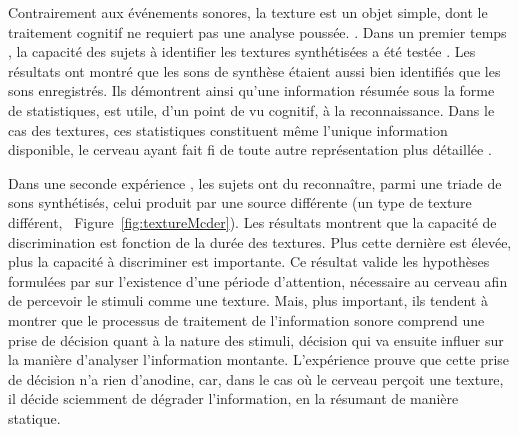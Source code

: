 Contrairement aux événements sonores, la texture est un objet simple, dont le traitement cognitif ne requiert pas une analyse poussée.    . 
Dans un premier temps  \citep{mcdermott2011sound}, la capacité des sujets à identifier les textures synthétisées a été testée . Les résultats ont montré que les sons de synthèse étaient aussi bien identifiés que les sons enregistrés. Ils démontrent  ainsi qu'une information résumée sous la forme de statistiques, est utile, d'un point de vu cognitif, à la reconnaissance. Dans le cas des textures, ces statistiques constituent même l'unique information disponible, le cerveau ayant fait fi de toute autre représentation plus détaillée \citep{nelken2013ear}.

Dans une seconde expérience \citep{mcdermott2013summary}, les sujets ont du reconnaître, parmi une triade de sons synthétisés, celui produit par une source différente (\ie un type de texture différent, \Cf~Figure~\ref{fig:textureMcder}). Les résultats montrent que la capacité de discrimination est fonction de la durée des textures. Plus cette dernière est élevée, plus la capacité à discriminer est importante. Ce résultat valide les hypothèses formulées par \citep{saint1995classification} sur l'existence d'une période d'attention, nécessaire au cerveau afin de percevoir le stimuli comme une texture. Mais, plus important, ils tendent à montrer  que le processus de traitement de l'information sonore comprend une prise de décision quant à la nature des stimuli, décision qui va  ensuite influer sur la manière d'analyser l'information montante. L'expérience prouve que cette prise de décision n'a rien d'anodine, car, dans le cas où le cerveau perçoit une texture, il décide sciemment de dégrader l'information, en la résumant de manière statique.

